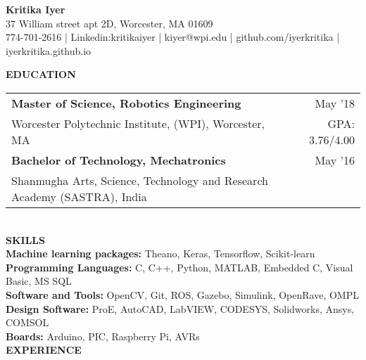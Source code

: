 \documentclass[10pt,a4paper]{article}
\begin{document}
\begin{center}

\textbf{\Large{Kritika Iyer}}\\
37 William street apt 2D, Worcester, MA 01609\\
774-701-2616 | Linkedin:kritikaiyer | kiyer@wpi.edu | github.com/iyerkritika | iyerkritika.github.io\\
\end{center}
\textbf{EDUCATION}\\
\begin{tabular}{p{} r}
\textbf{Master of Science, Robotics Engineering} & May '18 \\
Worcester Polytechnic Institute, (WPI), Worcester, MA & GPA: 3.76/4.00 \\[1ex]
\textbf{Bachelor of Technology, Mechatronics} & May '16 \\
Shanmugha Arts, Science, Technology  and Research Academy (SASTRA), India
\end{tabular}
\\[1\baselineskip]
\textbf{SKILLS}\\
\textbf{Machine learning packages:} Theano, Keras, Tensorflow, Scikit-learn\\
\textbf{Programming Languages:} C, C++, Python, MATLAB, Embedded C, Visual Basic, MS SQL\\
\textbf{Software and Tools:} OpenCV, Git, ROS, Gazebo, Simulink, OpenRave, OMPL \\
\textbf{Design Software:} ProE, AutoCAD, LabVIEW, CODESYS, Solidworks, Ansys, COMSOL\\
\textbf{Boards:} Arduino, PIC, Raspberry Pi, AVRs\\[1\baselineskip]
\textbf{EXPERIENCE}\\
\end{document}

